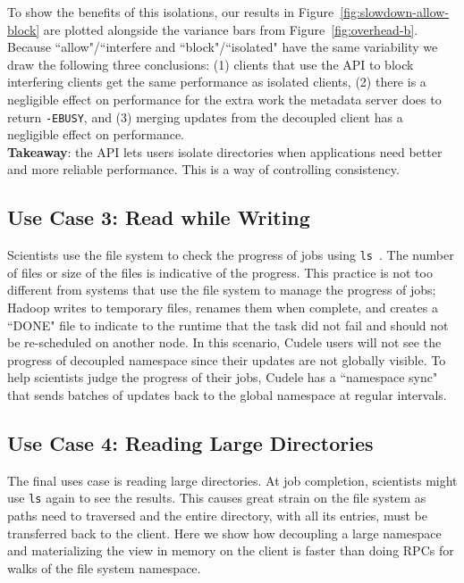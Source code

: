 To show the benefits of this isolations, our results in
Figure~\ref{fig:slowdown-allow-block} are plotted alongside the variance bars from
Figure~\ref{fig:overhead-b}. Because ``allow"/``interfere and
``block"/``isolated" have the same variability we draw the following three
conclusions: (1) clients that use the API to block interfering clients  get
the same performance as isolated clients, (2) there is a negligible effect on
performance for the extra work the metadata server does to return
\texttt{-EBUSY}, and (3) merging updates from the decoupled client has a
negligible effect on performance.\\

\noindent\textbf{Takeaway}: the API lets users isolate directories when
applications need better and more reliable performance. This is a way of
controlling consistency.

\subsection{Use Case 3: Read while Writing}

Scientists use the file system to check the progress of jobs using
\texttt{ls}~\cite{CITEME}. The number of files or size of the files is
indicative of the progress. This practice is not too different from systems
that use the file system to manage the progress of jobs; Hadoop writes to
temporary files, renames them when complete, and creates a ``DONE" file to
indicate to the runtime that the task did not fail and should not be
re-scheduled on another node. In this scenario, Cudele users will not see the
progress of decoupled namespace since their updates are not globally visible.
To help scientists judge the progress of their jobs, Cudele has a ``namespace
sync" that sends batches of updates back to the global namespace at regular
intervals.

\subsection{Use Case 4: Reading Large Directories} 

The final uses case is reading large directories. At job completion, scientists
might use \texttt{ls} again to see the results. This causes great strain on the
file system as paths need to traversed and the entire directory, with all its
entries, must be transferred back to the client. Here we show how decoupling a
large namespace and materializing the view in memory on the client is faster
than doing RPCs for walks of the file system namespace.

